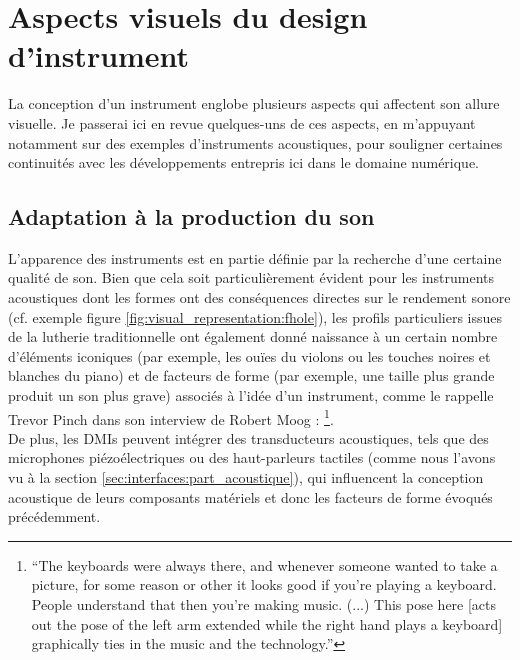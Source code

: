 \clearpage

\section{Aspects visuels du design d'instrument}

\noindent La conception d'un instrument englobe plusieurs aspects qui affectent son allure visuelle. Je passerai ici en revue quelques-uns de ces aspects, en m'appuyant notamment sur des exemples d'instruments acoustiques, pour souligner certaines continuités avec les développements entrepris ici dans le domaine numérique.

\subsection{Adaptation à la production du son}
\label{sec:visual_representation:visual_aspects:adaptation_to_sound}


\noindent L'apparence des instruments est en partie définie par la recherche d'une certaine qualité de son. Bien que cela soit particulièrement évident pour les instruments acoustiques dont les formes ont des conséquences directes sur le rendement sonore (cf. exemple figure \ref{fig:visual_representation:fhole}), les profils particuliers issues de la lutherie traditionnelle ont également donné naissance à un certain nombre d'éléments iconiques (par exemple, les ouïes du violons ou les touches noires et blanches du piano) et de facteurs de forme (par exemple, une taille plus grande produit un son plus grave) associés à l'idée d'un instrument, comme le rappelle Trevor Pinch dans son interview de Robert Moog \cite{pinch_why_2001}: \footnote{``The keyboards were always there, and whenever someone wanted to take a picture, for some reason or other it looks good if you’re playing a keyboard. People understand that then you’re making music. (...) This pose here [acts out the pose of the left arm extended while the right hand plays a keyboard] graphically ties in the music and the technology.''}.\\
\indent De plus, les \glspl{DMI} peuvent intégrer des transducteurs acoustiques, tels que des microphones piézoélectriques ou des haut-parleurs tactiles (comme nous l'avons vu à la section \ref{sec:interfaces:part_acoustique}), qui influencent la conception acoustique de leurs composants matériels et donc les facteurs de forme évoqués précédemment.

